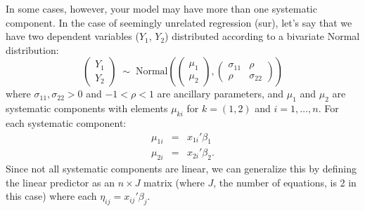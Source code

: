 \documentclass[oneside,letterpaper,12pt]{article}
\begin{document}
In some cases, however, your model may have more than one systematic
component.  In the case of seemingly unrelated regression ({\sc sur}),
let's say that we have two dependent variables ($Y_1$, $Y_2$)
distributed according to a bivariate Normal distribution:
\begin{equation*}
\left( \begin{array}{c} Y_1 \\ Y_2 \end{array} \right) \; \sim \; 
\textrm{Normal}\left( \left(\begin{array}{c} \mu_1 \\ \mu_2 \end{array} \right), 
\left(\begin{array}{cc} \sigma_{11} & \rho \\ \rho & \sigma_{22} 
\end{array} \right) \right)
\end{equation*} 
where $\sigma_{11}, \sigma_{22} > 0$ and $-1 < \rho < 1$ are ancillary
parameters, and $\mu_1$ and $\mu_2$ are systematic components with
elements $\mu_{ki}$ for $k = (1,2)$ and $i = 1, \dots, n$.  For each
systematic component:
\begin{eqnarray*}
\mu_{1i} &=& x_{1i}' \beta_1 \\
\mu_{2i} &=& x_{2i}' \beta_2.
\end{eqnarray*}
Since not all systematic components are linear, we can generalize this
by defining the linear predictor as an $n \times J$ matrix (where $J$,
the number of equations, is 2 in this case) where each $\eta_{ij} =
x_{ij}' \beta_j$.  
\end{document}
